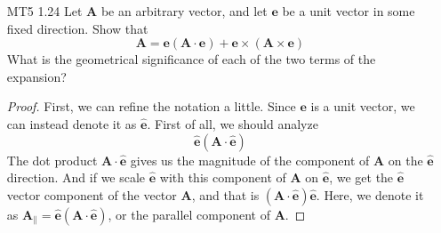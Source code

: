 \documentclass[12pt]{article}
\newcommand{\paren}[1]{\left( #1 \right)}
\begin{document}
\begin{enumerate}
        \item[MT5 1.24] Let \(\mathbf{A}\) be an arbitrary vector, and let \(\mathbf{e}\) be a unit vector in some fixed direction. Show that
        \[
        \mathbf{A} = \mathbf{e} (\mathbf{A} \cdot \mathbf{e}) + \mathbf{e} \times (\mathbf{A} \times \mathbf{e})
        \]
        What is the geometrical significance of each of the two terms of the expansion?

        \begin{proof}
            First, we can refine the notation a little. Since $\mathbf{e}$ is a unit vector, we can instead denote it as $\hat{\mathbf{e}}$. First of all, we should analyze
        \[
        \hat{\mathbf{e}}\paren{\mathbf{A}\cdot \hat{\mathbf{e}}}
        \]
        The dot product $\mathbf{A}\cdot \hat{\mathbf{e}}$ gives us the magnitude of the component of $\mathbf{A}$ on the $\hat{\mathbf{e}}$ direction. And if we scale $\hat{\mathbf{e}}$ with this component of $\mathbf{A}$ on $\hat{\mathbf{e}}$, we get the $\hat{\mathbf{e}}$ vector component of the vector $\mathbf{A}$, and that is $\paren{\mathbf{A}\cdot \hat{\mathbf{e}}}\hat{\mathbf{e}}$. Here, we denote it as $\mathbf{A}_\parallel = \hat{\mathbf{e}}\paren{\mathbf{A}\cdot \hat{\mathbf{e}}}$, or the parallel component of $\mathbf{A}$.


\end{proof}
\end{enumerate}
\end{document}
